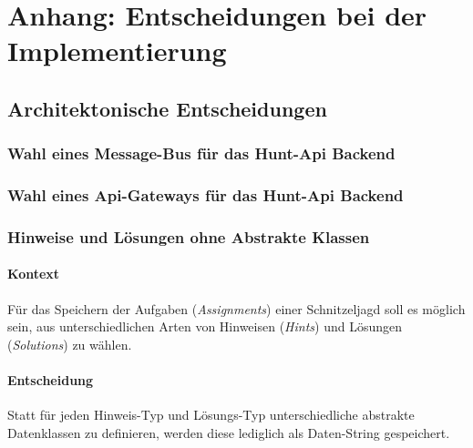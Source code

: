 \chapter{Anhang: Entscheidungen bei der Implementierung}

\section{Architektonische Entscheidungen}

\subsection{Wahl eines Message-Bus für das Hunt-Api Backend}


\subsection{Wahl eines Api-Gateways für das Hunt-Api Backend}


\subsection{Hinweise und Lösungen ohne Abstrakte Klassen} \label{appendix:adr:er}

\subsubsection{Kontext}

Für das Speichern der Aufgaben (\textit{Assignments}) einer Schnitzeljagd soll es möglich sein, aus unterschiedlichen Arten von Hinweisen (\textit{Hints}) und Lösungen (\textit{Solutions}) zu wählen.

\subsubsection{Entscheidung}

Statt für jeden Hinweis-Typ und Lösungs-Typ unterschiedliche abstrakte Datenklassen zu definieren, werden diese lediglich als Daten-String gespeichert.

